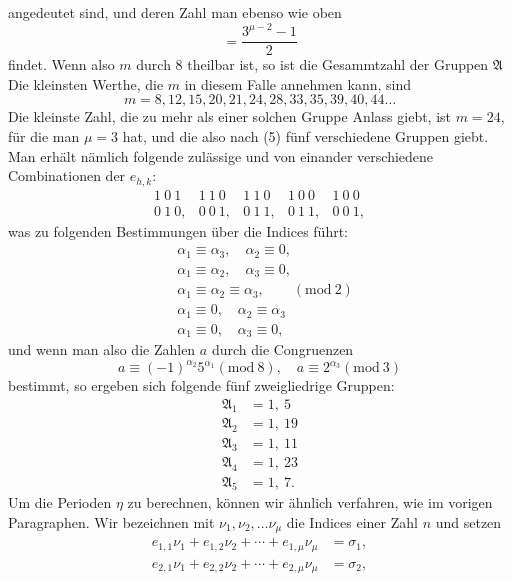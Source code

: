 angedeutet sind, und deren Zahl man ebenso wie oben
\[
= \frac{3^{\mu - 2} - 1}{2}
\]
findet. Wenn also $m$ durch 8 theilbar ist, so ist die Gesammtzahl der Gruppen $\mathfrak{A}$
Die kleinsten Werthe, die $m$ in diesem Falle annehmen kann, sind
\[
m = 8, 12, 15, 20, 21, 24, 28, 33, 35, 39, 40, 44 \ldots
\]
Die kleinste Zahl, die zu mehr als einer solchen Gruppe Anlass giebt, ist $m = 24$, für die man $\mu = 3$ hat, und die also nach (5) fünf verschiedene Gruppen giebt. Man erhält nämlich folgende zulässige und von einander verschiedene Combinationen der $e_{h,k}$: %
\[
\begin{array}{ccccc}
1\ 0\ 1 & 1\ 1\ 0 & 1\ 1\ 0 & 1\ 0\ 0 & 1\ 0\ 0\\
0\ 1\ 0, & 0\ 0\ 1, & 0\ 1\ 1, & 0\ 1\ 1, & 0\ 0\ 1,
\end{array}
\]
was zu folgenden Bestimmungen über die Indices führt:
\[
\begin{aligned}
& \alpha_1 \equiv \alpha_3,\quad \alpha_2 \equiv 0,\\
& \alpha_1 \equiv \alpha_2,\quad \alpha_3 \equiv 0,\\
& \alpha_1 \equiv \alpha_2 \equiv \alpha_3,\qquad (\mathrm{mod}\ 2)\\
& \alpha_1 \equiv 0,\quad \alpha_2 \equiv \alpha_3\\
& \alpha_1 \equiv 0,\quad \alpha_3 \equiv 0,
\end{aligned}
\]
und wenn man also die Zahlen $a$ durch die Congruenzen
\[
a \equiv (-1)^{\alpha_2} 5^{\alpha_1} (\mathrm{mod}\ 8), \quad a \equiv 2^{\alpha_3} (\mathrm{mod}\ 3)
\]
bestimmt, so ergeben sich folgende fünf zweigliedrige Gruppen:
\[
\begin{aligned}
\mathfrak{A}_1 &= 1,\ 5\\
\mathfrak{A}_2 &= 1,\ 19\\
\mathfrak{A}_3 &= 1,\ 11\\
\mathfrak{A}_4 &= 1,\ 23\\
\mathfrak{A}_5 &= 1,\ 7.
\end{aligned}
\]
Um die Perioden $\eta$ zu berechnen, können wir ähnlich verfahren, wie im vorigen Paragraphen. Wir bezeichnen mit $\nu_1, \nu_2, \ldots \nu_\mu$ die Indices einer Zahl $n$ und setzen
\[
\begin{aligned}
e_{1,1} \nu_1 + e_{1,2} \nu_2 + \cdots + e_{1,\mu} \nu_\mu &= \sigma_1,\\
e_{2,1} \nu_1 + e_{2,2} \nu_2 + \cdots + e_{2,\mu} \nu_\mu &= \sigma_2,
\end{aligned}
\]

